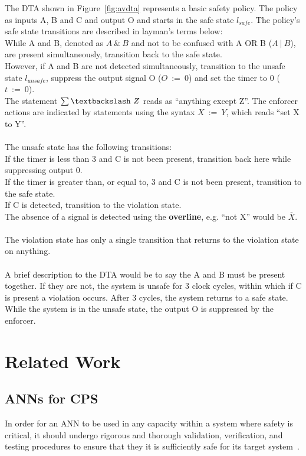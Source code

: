\begin{example}\label{ex:dta}
	The \ac{DTA} shown in Figure~\ref{fig:avdta} represents a basic safety policy.
	The policy as inputs A, B and C and output O and starts in the safe state $l_{safe}$.
	The policy's safe state transitions are described in layman's terms below: \\
	While A and B, denoted as $A~\&~B$ and not to be confused with A OR B ($A~|~B$), are present simultaneously, transition back to the safe state.\\
	However, if A and B are not detected simultaneously, transition to the unsafe state $l_{unsafe}$, suppress the output signal O ($O~:=~0$) and set the timer to 0 ($t~:=~0$).\\
	The statement $\sum\textbackslash~Z$ reads as ``anything except Z''.
	The enforcer actions are indicated by statements using the syntax $X~:=~Y$, which reads ``set X to Y''.\\
	\\
	The unsafe state has the following transitions:\\
	If the timer is less than 3 and C is not been present, transition back here while suppressing output 0.\\
	If the timer is greater than, or equal to, 3 and C is not been present, transition to the safe state.\\
	If C is detected, transition to the violation state.\\
	The absence of a signal is detected using the \textbf{overline}, e.g. ``not X'' would be $\overline{X}$.\\
	\\
	The violation state has only a single transition that returns to the violation state on anything.\\
	\\
	A brief description to the \ac{DTA} would be to say the A and B must be present together. 
	If they are not, the system is unsafe for 3 clock cycles, within which if C is present a violation occurs.
	After 3 cycles, the system returns to a safe state.
	While the system is in the unsafe state, the output O is suppressed by the enforcer.
\end{example}

\section{Related Work}
\subsection{\acfp{ANN} for \acf{CPS}}
In order for an \ac{ANN} to be used in any capacity within a system where safety is critical, it should undergo rigorous and thorough validation, verification, and testing procedures to ensure that they it is sufficiently safe for its target system~\cite{scann, ANNSafetyLifecycle2003}. 

